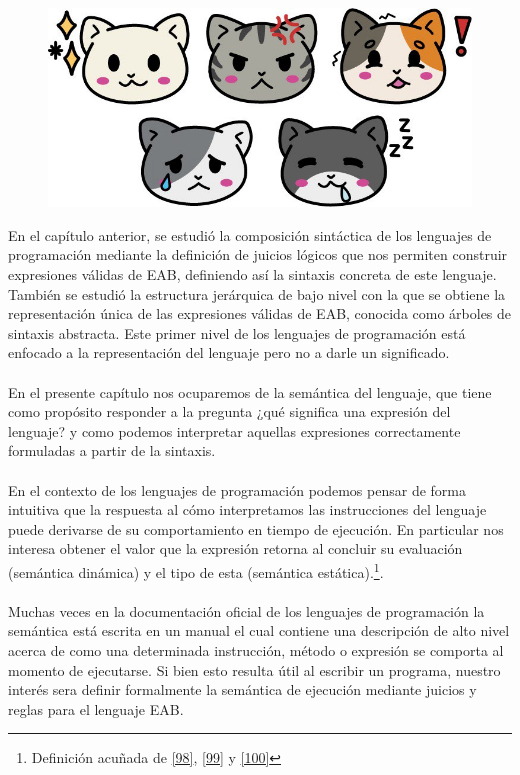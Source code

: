 
\begin{figure}[htbp]
    \centerline{\includegraphics[scale=.4]{assets/04_gatito_semantica.jpg}}       
\end{figure}


\bigskip
\bigskip
\bigskip
\bigskip


    En el capítulo anterior, se estudió la composición sintáctica de los lenguajes de programación mediante la definición de juicios lógicos que nos permiten construir expresiones válidas de \textsf{EAB}, definiendo así la sintaxis 
    concreta de este lenguaje. También se estudió la estructura jerárquica de bajo nivel con la que se obtiene la representación única de las expresiones válidas de \textsf{EAB}, conocida como árboles de sintaxis abstracta. Este primer nivel de los lenguajes de programación está enfocado a la representación del lenguaje pero no a darle un significado.\\\\
    En el presente capítulo nos ocuparemos de la semántica del lenguaje, que tiene como propósito responder a la pregunta ¿qué significa una expresión del lenguaje? y como podemos interpretar aquellas expresiones correctamente formuladas a partir de la sintaxis.\\\\
    En el contexto de los lenguajes de programación podemos pensar de forma intuitiva que la respuesta al cómo interpretamos las instrucciones del lenguaje puede derivarse de su comportamiento en tiempo de ejecución.
    En particular  nos interesa obtener el valor que la expresión retorna al concluir su evaluación (semántica dinámica) y el tipo de esta (semántica estática).\footnote{Definición acuñada de \hyperlink{98}{[98]}, \hyperlink{99}{[99]} y \hyperlink{100}{[100]}}.\\\\
    Muchas veces en la documentación oficial de los lenguajes de programación la semántica está escrita en un manual el cual contiene una descripción de alto nivel
    acerca de como una determinada instrucción, método o expresión se comporta al momento de ejecutarse. Si bien esto resulta útil al escribir un programa, nuestro interés sera definir formalmente la semántica de ejecución mediante juicios y reglas para el lenguaje \textsf{EAB}. \\

